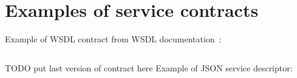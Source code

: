 \newpage
\appendix
\section{Examples of service contracts}
\label{sec:appendix_service_contracts}

Example of WSDL contract from WSDL documentation~\cite{wsdl_language_spec}:
\inputminted[linenos=true]{xml}{../source/service_contract/wsdl_example.xml}
\label{lst:wsdl_example}

\begin{landscape}
\large{TODO put last version of contract here}
Example of JSON service descriptor:
\inputminted[linenos=true]{json}{../source/service_contract/service_schema.json}
\label{lst:json_contract_example}

\end{landscape}
	
